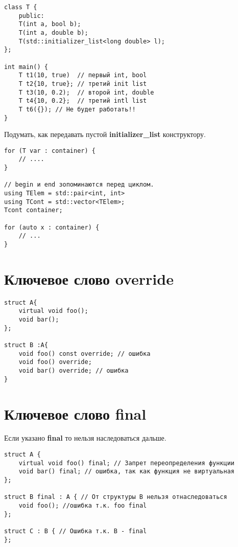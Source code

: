\documentclass[a4paper, 12pt, titlepage, finall]{extreport}
\begin{document}
\begin{lstlisting}
class T {
    public:
    T(int a, bool b);
    T(int a, double b);
    T(std::initializer_list<long double> l);
};

int main() {
    T t1(10, true)  // первый int, bool
    T t2{10, true}; // третий init list
    T t3(10, 0.2);  // второй int, double
    T t4{10, 0.2};  // третий intl list
    T t6({}); // Не будет работать!!
}
\end{lstlisting}
        Подумать, как передавать пустой {\bf initializer\_list} конструктору.
\begin{lstlisting}
for (T var : container) {
    // ....
}

// begin и end зопоминаются перед циклом.
using TElem = std::pair<int, int>
using TCont = std::vector<TElem>;
Tcont container;

for (auto x : container) {
    // ...
}
\end{lstlisting}
        \section{Ключевое слово override}
\begin{lstlisting}
struct A{
    virtual void foo();
    void bar();
};

struct B :A{
    void foo() const override; // ошибка
    void foo() override;
    void bar() override; // ошибка
}

\end{lstlisting}
        \section{Ключевое слово final}
            Если указано {\bf final} то нельзя наследоваться дальше.
\begin{lstlisting}
struct A {
    virtual void foo() final; // Запрет переопределения функции
    void bar() final; // ошибка, так как функция не виртуальная
};

struct B final : A { // От структуры B нельзя отнаследоваться
    void foo(); //ошибка т.к. foo final
};

struct C : B { // Ошибка т.к. B - final 
};
\end{lstlisting}
\end{document}
